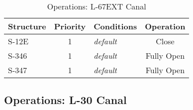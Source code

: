 \scriptsize
\begin{table}[!h]
\centering
\caption{Operations: L-67EXT Canal}
\label{tab:M11opsL67}
\begin{tabular}{|l|c|l|c|c|}
\hline
\textbf{Structure} & \textbf{Priority}  & \textbf{Conditions} & \multicolumn{2}{|c|}{\textbf{Operation}}   \\
\hline
\hline
S-12E         &  1  & \it{default}    & \multicolumn{2}{|c|}{Close}   \\
\hline
S-346         &  1  & \it{default}    & \multicolumn{2}{|c|}{Fully Open}   \\
\hline
S-347         &  1  & \it{default}    & \multicolumn{2}{|c|}{Fully Open}   \\
\hline
\hline
\end{tabular}
\end{table}
\normalsize


\subsection{Operations: L-30 Canal}

